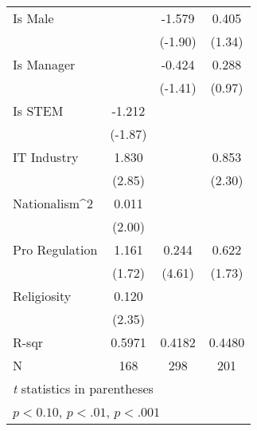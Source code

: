 {\begin{tabular}{l*{3}{c}}
    \addlinespace
    Is Male             &                & -1.579\sym{*}  & 0.405                                  \\
                        &                & (-1.90)        & (1.34)                                 \\
    \addlinespace
    Is Manager          &                & -0.424         & 0.288                                  \\
                        &                & (-1.41)        & (0.97)                                 \\
    \addlinespace
    Is STEM             & -1.212\sym{*}  &                &                                        \\
                        & (-1.87)        &                &                                        \\
    \addlinespace
    IT Industry         & 1.830\sym{**}  &                & 0.853\sym{*}                           \\
                        & (2.85)         &                & (2.30)                                 \\
    \addlinespace
    Nationalism^2       & 0.011\sym{*}   &                &                                        \\
                        & (2.00)         &                &                                        \\
    \addlinespace
    Pro Regulation      & 1.161\sym{*}   & 0.244\sym{***} & 0.622\sym{*}                           \\
                        & (1.72)         & (4.61)         & (1.73)                                 \\
    \addlinespace
    Religiosity         & 0.120\sym{*}   &                &                                        \\
                        & (2.35)         &                &                                        \\
    \midrule
    R-sqr               & 0.5971         & 0.4182         & 0.4480                                 \\
    N                   & 168            & 298            & 201                                    \\
    \bottomrule
    \multicolumn{4}{l}{\footnotesize \textit{t} statistics in parentheses}                         \\
    \multicolumn{4}{l}{\footnotesize \sym{*} \(p<0.10\), \sym{**} \(p<.01\), \sym{***} \(p<.001\)} \\
\end{tabular}
}
